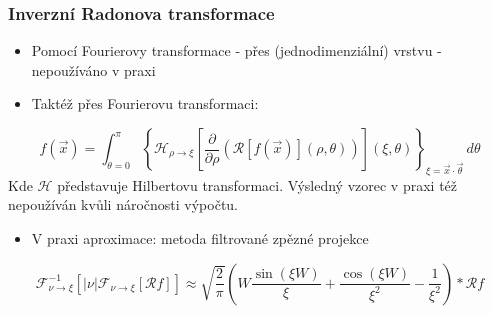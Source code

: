 \documentclass{beamer}
\begin{document}
\begin{frame}
\frametitle{Inverzní Radonova transformace}
\begin{itemize}
\item Pomocí Fourierovy transformace - přes (jednodimenziální) vrstvu - nepoužíváno v praxi
\item Taktéž přes Fourierovu transformaci:
\end{itemize}
\begin{equation}
f(\vec{x})=  \int_{\theta=0}^{\pi}
	\left\lbrace
		\mathcal{H}_{\rho \to \xi}
			\left[\frac{\partial}{\partial\rho}
				\left(\mathcal{R}[f(\vec{x})](\rho,\theta)
				\right)
			\right]
		(\xi,\theta)
	\right\rbrace
	_{\xi = \vec{x}\cdot\vec{\theta}}
	\,d\theta
\end{equation}
Kde $\mathcal{H}$ představuje Hilbertovu transformaci. Výsledný vzorec v praxi též nepoužíván kvůli náročnosti výpočtu.
\begin{itemize}
\item V praxi aproximace: metoda filtrované zpězné projekce
\end{itemize}
 \begin{equation}
   	\mathcal{F}^{-1}_{\nu \to \xi}\left[|{\nu}|\mathcal{F}_{\nu \to \xi}\left[\mathcal{R}f\right]\right]
	\approx
    \sqrt{\frac{2}{\pi}}
    \left(W\frac{\sin\left(\xi W\right)}{\xi}
      +\frac{\cos \left( \xi W \right)}{\xi ^2}-\frac{1}{\xi^2}\right)*\mathcal{R}f	
\end{equation}
\end{frame}
\end{document}
